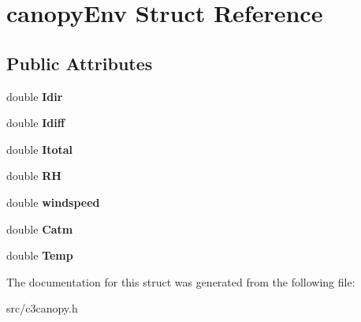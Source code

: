 \hypertarget{structcanopy_env}{\section{canopy\-Env Struct Reference}
\label{structcanopy_env}
}
\subsection*{Public Attributes}
\begin{DoxyCompactItemize}
\item 
\hypertarget{structcanopy_env_a85d7c904a64f1b88c7814d48462afc70}{double {\bfseries Idir}}\label{structcanopy_env_a85d7c904a64f1b88c7814d48462afc70}

\item 
\hypertarget{structcanopy_env_a7438ad788130f6dfd45c92ed942f4c84}{double {\bfseries Idiff}}\label{structcanopy_env_a7438ad788130f6dfd45c92ed942f4c84}

\item 
\hypertarget{structcanopy_env_a11e9663c7b79c20d810909e4d0f4223b}{double {\bfseries Itotal}}\label{structcanopy_env_a11e9663c7b79c20d810909e4d0f4223b}

\item 
\hypertarget{structcanopy_env_aa75e1cc8adf9f2245566a3bdc8e7fd35}{double {\bfseries R\-H}}\label{structcanopy_env_aa75e1cc8adf9f2245566a3bdc8e7fd35}

\item 
\hypertarget{structcanopy_env_aa831644220c5ce9dc505459363eae378}{double {\bfseries windspeed}}\label{structcanopy_env_aa831644220c5ce9dc505459363eae378}

\item 
\hypertarget{structcanopy_env_a1924256491b4b1d0df11ded6b581f023}{double {\bfseries Catm}}\label{structcanopy_env_a1924256491b4b1d0df11ded6b581f023}

\item 
\hypertarget{structcanopy_env_a5abf84f5aaba5152cbb0ab0dd831de75}{double {\bfseries Temp}}\label{structcanopy_env_a5abf84f5aaba5152cbb0ab0dd831de75}

\end{DoxyCompactItemize}


The documentation for this struct was generated from the following file\-:\begin{DoxyCompactItemize}
\item 
src/c3canopy.\-h\end{DoxyCompactItemize}
